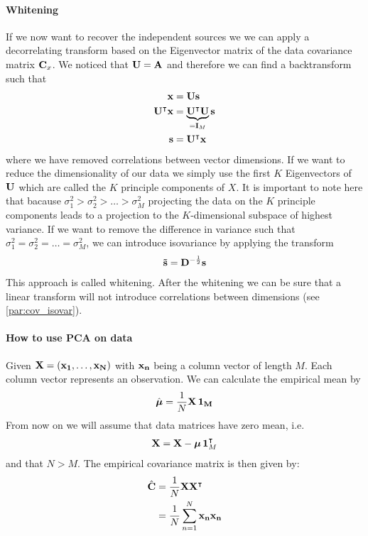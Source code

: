 \paragraph{Whitening} If we now want to recover the independent sources we we can apply a decorrelating
transform based on the Eigenvector matrix of the data covariance matrix $\mathbf{C}_x$. We noticed that
$\mathbf{U} = \mathbf{A}$ and therefore we can find a backtransform such that
\begin{align}
	\mathbf{x} &= \mathbf{U s} \\
	\mathbf{U ^\intercal x} &= \underbrace{\mathbf{U^\intercal U}}_{ = \operatorname{\mathbf{I}}_M} \mathbf{s} \\
    \mathbf{s} &= \mathbf{U^\intercal x}
\end{align}
where we have removed correlations between vector dimensions. If we want to reduce the dimensionality
of our data we simply use the first $K$ Eigenvectors of $\mathbf{U}$ which are called the $K$ principle
components of $X$. It is important to note here that bacause $\sigma_1^2 > \sigma_2^2 > \dots > \sigma_M^2$
projecting the data on the $K$ principle components leads to a projection to the $K$-dimensional subspace 
of highest variance. If we want to remove the difference in variance such that 
$\sigma_1^2 = \sigma_2^2 = \dots = \sigma_M^2$, we can introduce isovariance by applying the transform
\begin{align}
	\mathbf{\tilde{s}} = \mathbf{D}^{-\frac{1}{2}} \mathbf{s}
\end{align}
This approach is called whitening. After the whitening we can be sure that a linear transform will
not introduce correlations between dimensions (see \ref{par:cov_isovar}).

\paragraph{How to use PCA on data}
Given $\mathbf{X} = (\mathbf{x_1}, \dots, \mathbf{x_N})$ with $\mathbf{x_n}$ being a column vector of length $M$. 
Each column vector represents an observation. We can calculate the empirical mean by 
\begin{align}
	\hat{\mathbf{\boldsymbol \mu}} = \frac{1}{N} \mathbf{X \operatorname{\mathbf{1}}_M}
\end{align}
From now on we will assume that data matrices have zero mean, i.e. 
\begin{align*}
	\mathbf{X} = \mathbf{X} - \mathbf{\boldsymbol \mu}\operatorname{\mathbf{1}}_M^\intercal
\end{align*}
and that $N > M$. The empirical covariance matrix is then given by:
\begin{align}
	\begin{split}
	\hat{\mathbf{C}} &= \frac{1}{N} \mathbf{X X ^\intercal} \\
	             &= \frac{1}{N} \sum_{n = 1}^N \mathbf{x_n x_n}
	\end{split}
\end{align}

